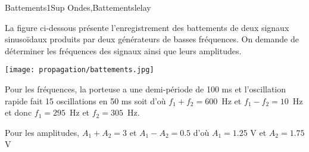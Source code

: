 \begin{exercise}{Battements}{1}{Sup}
{Ondes,Battements}{lelay}

La figure ci-dessous présente l'enregistrement des battements de deux signaux sinusoïdaux produits par deux générateurs de basses fréquences. On demande de déterminer les fréquences des signaux ainsi que leurs amplitudes.
 
\texttt{[image: propagation/battements.jpg]}
\end{exercise}

\begin{solution}
Pour les fréquences, la porteuse a une demi-période de 100 ms et l'oscillation rapide fait 15 oscillations en 50 ms soit d'où $f_1 + f_2 = 600$~Hz et $f_1-f_2 = 10$~Hz et donc $f_1 = 295$~Hz et $f_2 = 305$~Hz.

Pour les amplitudes, $A_1 + A_2 = 3$ et $A_1- A_2 = 0.5$ d'où $A_1 = 1.25$ V et $A_2 = 1.75$ V
\end{solution}